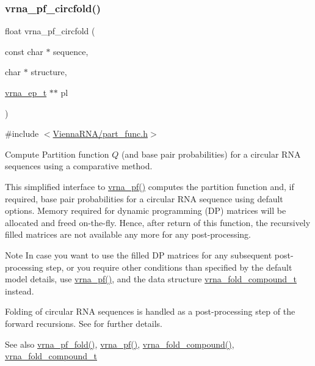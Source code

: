 \subsubsection{\texorpdfstring{vrna\+\_\+pf\+\_\+circfold()}{vrna\_pf\_circfold()}}
{\footnotesize\ttfamily float vrna\+\_\+pf\+\_\+circfold (\begin{DoxyParamCaption}\item[{const char $\ast$}]{sequence,  }\item[{char $\ast$}]{structure,  }\item[{\hyperlink{group__struct__utils__plist_gab9ac98ab55ded9fb90043b024b915aca}{vrna\+\_\+ep\+\_\+t} $\ast$$\ast$}]{pl }\end{DoxyParamCaption})}



{\ttfamily \#include $<$\hyperlink{part__func_8h}{Vienna\+R\+N\+A/part\+\_\+func.\+h}$>$}



Compute Partition function $Q$ (and base pair probabilities) for a circular R\+NA sequences using a comparative method. 

This simplified interface to \hyperlink{group__part__func__global_ga29e256d688ad221b78d37f427e0e99bc}{vrna\+\_\+pf()} computes the partition function and, if required, base pair probabilities for a circular R\+NA sequence using default options. Memory required for dynamic programming (DP) matrices will be allocated and free\textquotesingle{}d on-\/the-\/fly. Hence, after return of this function, the recursively filled matrices are not available any more for any post-\/processing.

\begin{DoxyNote}{Note}
In case you want to use the filled DP matrices for any subsequent post-\/processing step, or you require other conditions than specified by the default model details, use \hyperlink{group__part__func__global_ga29e256d688ad221b78d37f427e0e99bc}{vrna\+\_\+pf()}, and the data structure \hyperlink{group__fold__compound_ga1b0cef17fd40466cef5968eaeeff6166}{vrna\+\_\+fold\+\_\+compound\+\_\+t} instead.
\end{DoxyNote}
Folding of circular R\+NA sequences is handled as a post-\/processing step of the forward recursions. See \cite{hofacker:2006} for further details.

\begin{DoxySeeAlso}{See also}
\hyperlink{group__part__func__global_gac4a2a74a79e49818bc35412a2b392c7e}{vrna\+\_\+pf\+\_\+fold()}, \hyperlink{group__part__func__global_ga29e256d688ad221b78d37f427e0e99bc}{vrna\+\_\+pf()}, \hyperlink{group__fold__compound_ga6601d994ba32b11511b36f68b08403be}{vrna\+\_\+fold\+\_\+compound()}, \hyperlink{group__fold__compound_ga1b0cef17fd40466cef5968eaeeff6166}{vrna\+\_\+fold\+\_\+compound\+\_\+t}
\end{DoxySeeAlso}

